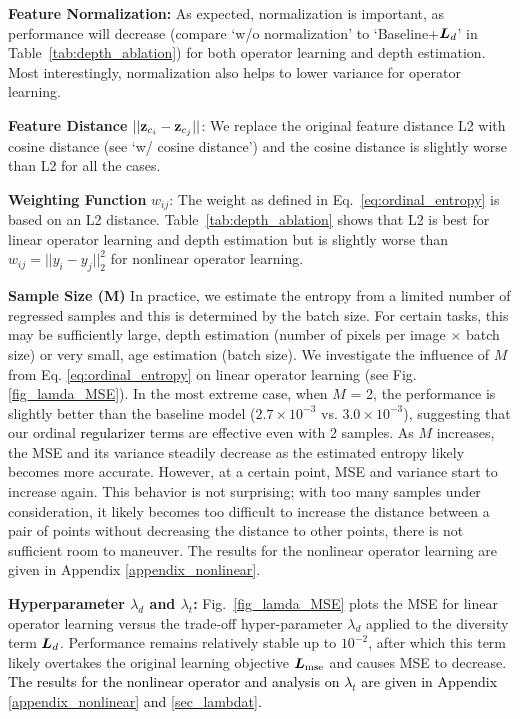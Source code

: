 \documentclass{article} %
\newcommand{\AY}[1]{{\color{purple} {\bf (AY: #1)}}}
\def\shihao{\textcolor{black}}
\begin{document}
\textbf{Feature Normalization:} As expected, normalization is important, as performance will decrease (compare `w/o normalization' to `Baseline+${\bm{L}}_d$' in Table~\ref{tab:depth_ablation}) for both operator learning and depth estimation.  Most interestingly, normalization also helps to lower variance for operator learning. 

\textbf{Feature Distance} $||{\bf z}_{c_i}-{\bf z}_{c_j}||$: We replace the original feature distance L2 with cosine distance (see `w/ cosine distance') and the cosine distance is slightly worse than L2 for all the cases.

\textbf{Weighting Function} $w_{ij}$: The weight as defined in Eq.~\ref{eq:ordinal_entropy} is based on an L2 distance. Table~\ref{tab:depth_ablation} shows that L2 is best for linear operator learning and depth estimation but is slightly worse than 
$w_{ij}= ||y_i -y_j||_2^2$
for nonlinear operator learning.


\textbf{Sample Size (M)}
In practice, we estimate the entropy from a limited number of regressed samples and this is determined by the batch size. For certain tasks, this may be sufficiently large, \eg depth estimation (number of pixels per image $\times$ batch size) or very small, \eg age estimation (batch size).  We investigate the influence of $M$ from Eq. \ref{eq:ordinal_entropy} on linear operator learning (see Fig.\ref{fig_lamda_MSE}).
In the most extreme case, when $M$ = 2, the performance is slightly better than the baseline model ($2.7 \times 10^{-3}$ vs. $3.0 \times 10^{-3}$), suggesting that our ordinal \shihao{regularizer} terms are effective even with 2 samples. 
As $M$ increases, the MSE and its variance steadily decrease as the estimated entropy likely becomes more accurate.  However, at a certain point, MSE and variance start to increase again. This behavior is not surprising; with too many samples under consideration, it likely becomes too difficult to increase the distance between a pair of points without decreasing the distance to other points, \ie there is not sufficient room to maneuver. 
The results for the nonlinear operator learning are given in Appendix \ref{appendix_nonlinear}.


\textbf{Hyperparameter $\lambda_d$ and $\lambda_t$:} 
Fig.~\ref{fig_lamda_MSE} plots the MSE for linear operator learning versus the trade-off hyper-parameter  $\lambda_d$ applied to the diversity term ${\bm{L}}_d$.  Performance remains relatively stable up to $10^{-2}$, after which this term likely overtakes the original learning objective ${\bm{L}}_{\text{mse}}$ and causes MSE to decrease.
\shihao{The results for the nonlinear operator and analysis on $\lambda_t$ are given in Appendix \ref{appendix_nonlinear} and \ref{sec_lambdat}.}
\end{document}
